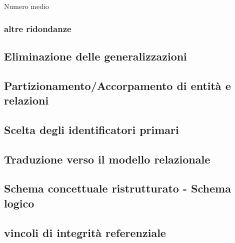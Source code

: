 Numero medio 


\subsubsection{altre ridondanze}

\subsection{Eliminazione delle generalizzazioni}

\subsection{Partizionamento/Accorpamento di entità e relazioni}

\subsection{Scelta degli identificatori primari}

\subsection{Traduzione verso il modello relazionale}

\subsection{Schema concettuale ristrutturato - Schema logico}

\subsection{vincoli di integrità referenziale}
